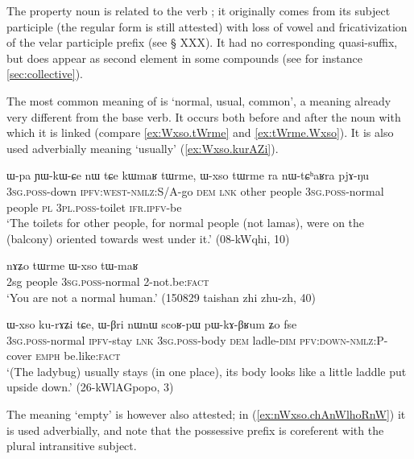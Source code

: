 The property noun  is related to the verb ; it originally comes from its subject participle (the regular form  is still attested) with loss of vowel and fricativization of the velar participle prefix (see § XXX). It had no corresponding quasi-suffix, but does appear as second element in some compounds  (see for instance \ref{sec:collective}).

The most common meaning of  is `normal, usual, common', a meaning already very different from the base verb. It occurs both before and after the noun with which it is linked (compare \ref{ex:Wxso.tWrme} and \ref{ex:tWrme.Wxso}). It is also used adverbially meaning `usually' (\ref{ex:Wxso.kurAZi}).

\begin{exe}
\ex \label{ex:Wxso.tWrme}
\gll ɯ-pa ɲɯ-kɯ-ɕe nɯ tɕe kɯmaʁ tɯrme, ɯ-xso tɯrme ra nɯ-tɕʰaʁra pjɤ-ŋu \\
\textsc{3sg.poss}-down \textsc{ipfv}:\textsc{west}-\textsc{nmlz}:S/A-go \textsc{dem} \textsc{lnk} other people \textsc{3sg.poss}-normal people \textsc{pl} \textsc{3pl.poss}-toilet \textsc{ifr.ipfv}-be \\
\glt `The toilets for other people, for normal people (not lamas), were on the (balcony) oriented towards west under it.' (08-kWqhi, 10)
\end{exe} 

\begin{exe}
\ex \label{ex:tWrme.Wxso}
\gll   nɤʑo tɯrme ɯ-xso tɯ-maʁ \\
2sg people  \textsc{3sg.poss}-normal  2-not.be:\textsc{fact} \\
\glt `You are not a normal human.' (150829 taishan zhi zhu-zh, 40)
\end{exe} 

\begin{exe}
\ex \label{ex:Wxso.kurAZi}
\gll  ɯ-xso ku-rɤʑi tɕe,  ɯ-βri nɯnɯ scoʁ-pɯ pɯ-kɤ-βʁum ʑo fse  \\
\textsc{3sg.poss}-normal \textsc{ipfv}-stay \textsc{lnk} \textsc{3sg.poss}-body \textsc{dem} ladle-\textsc{dim} \textsc{pfv}:\textsc{down}-\textsc{nmlz}:P-cover \textsc{emph} be.like:\textsc{fact} \\
\glt `(The ladybug) usually stays (in one place), its body looks like a little laddle put upside down.' (26-kWlAGpopo, 3)
\end{exe} 

The meaning `empty' is however also attested; in (\ref{ex:nWxso.chAnWlhoRnW}) it is used adverbially, and note that the possessive prefix is coreferent with the plural intransitive subject.

